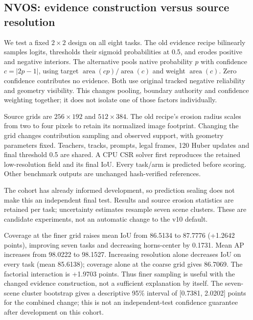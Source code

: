 \subsection{NVOS: evidence construction versus source resolution}
We test a fixed $2\times2$ design on all eight tasks. The old evidence recipe
bilinearly samples logits, thresholds their sigmoid probabilities at 0.5, and erodes positive and
negative interiors. The alternative pools native probability $p$ with confidence
$c=|2p-1|$, using target $\operatorname{area}(cp)/\operatorname{area}(c)$ and
weight $\operatorname{area}(c)$. Zero confidence contributes no evidence.
Both use original tracked negative reliability and geometry visibility.
This changes pooling, boundary authority and confidence weighting together;
it does not isolate one of those factors individually.

Source grids are $256\times192$ and $512\times384$. The old recipe's erosion
radius scales from two to four pixels to retain its normalized image footprint.
Changing the grid changes contribution sampling and observed support, with
geometry parameters fixed. Teachers, tracks, prompts, legal frames, 120 Huber
updates and final threshold 0.5 are shared. A CPU CSR solver first reproduces
the retained low-resolution field and its final IoU. Every task/arm is predicted
before scoring. Other benchmark outputs are unchanged hash-verified references.

\begin{table}[ht]
\centering\small

\caption{Fixed NVOS factorial study. Each column applies one recipe to all
eight tasks. Task rows use retained GT; mean rows separately report both GT boundary
conventions, followed by AP on the exact same response images. The two horns tasks share one scene. No per-task winners or
GT-selected thresholds are used.}
\label{tab:nvos-coverage}
\end{table}

The cohort has already informed development, so prediction sealing does not
make this an independent final test. Results and source erosion statistics
are retained per task; uncertainty estimates resample seven scene clusters.
These are candidate experiments, not an automatic change to the v10 default.

Coverage at the finer grid raises mean IoU from 86.5134 to 87.7776
(+1.2642 points), improving seven tasks and decreasing horns-center by 0.1731.
Mean AP increases from 98.0222 to 98.1527. Increasing resolution alone decreases
IoU on every task (mean 85.6138); coverage alone at the coarse grid gives 86.7069.
The factorial interaction is +1.9703 points. Thus finer sampling is useful
with the changed evidence construction, not a sufficient explanation by itself.
The seven-scene cluster bootstrap gives a descriptive 95\% interval of
[0.7381, 2.0202] points for the combined change; this is not an independent-test
confidence guarantee after development on this cohort.

